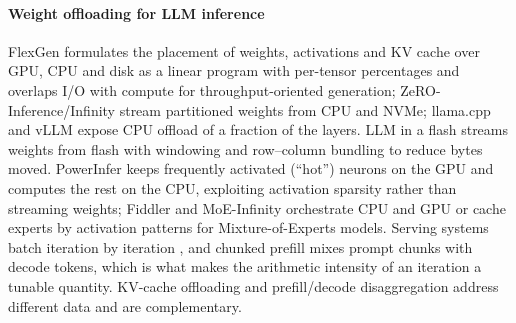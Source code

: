 \documentclass[preprint,12pt]{elsarticle}
\begin{document}
\paragraph{Weight offloading for LLM inference}
FlexGen \cite{sheng2023flexgen} formulates the placement of weights, activations and KV cache over GPU, CPU and disk as a linear program with per-tensor percentages and overlaps I/O with compute for throughput-oriented generation; ZeRO-Inference/Infinity \cite{rajbhandari2021infinity} stream partitioned weights from CPU and NVMe; llama.cpp \cite{gerganov2023llamacpp} and vLLM \cite{kwon2023vllm} expose CPU offload of a fraction of the layers. LLM in a flash \cite{alizadeh2024flash} streams weights from flash with windowing and row--column bundling to reduce bytes moved. PowerInfer \cite{song2024powerinfer} keeps frequently activated (``hot'') neurons on the GPU and computes the rest on the CPU, exploiting activation sparsity rather than streaming weights; Fiddler \cite{kamahori2025fiddler} and MoE-Infinity \cite{xue2024moeinfinity} orchestrate CPU and GPU or cache experts by activation patterns for Mixture-of-Experts models. Serving systems batch iteration by iteration \cite{yu2022orca,kwon2023vllm}, and chunked prefill \cite{agrawal2024sarathi} mixes prompt chunks with decode tokens, which is what makes the arithmetic intensity of an iteration a tunable quantity. KV-cache offloading \cite{lee2024infinigen,qin2025mooncake} and prefill/decode disaggregation \cite{zhong2024distserve} address different data and are complementary.
\end{document}
